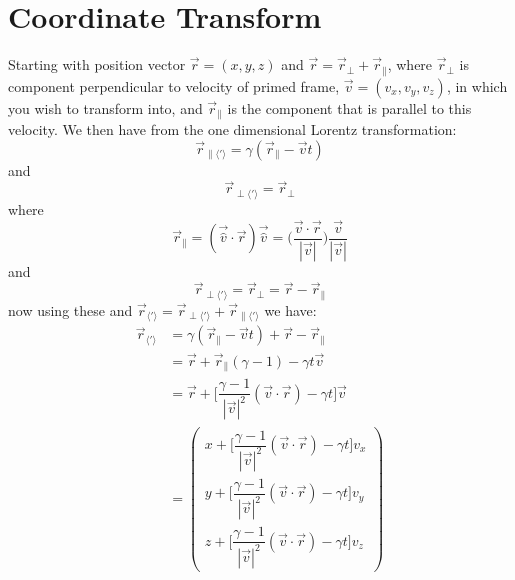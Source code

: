 \section{Coordinate Transform}

Starting with position vector $\vec{r} = (x,y,z)$ and $\vec{r} = \vec{r}_{\perp} + \vec{r}_{\parallel}$, where $\vec{r}_{\perp}$ is component perpendicular to velocity of primed frame, $\vec{v}= (v_x,v_y,v_z)$, in which you wish to transform into, and $\vec{r}_{\parallel}$ is the component that is parallel to this velocity. We then have from the one dimensional Lorentz transformation:
\begin{equation}%
    \vec{r}_{\parallel \langle ' \rangle}  = \gamma (\vec{r}_{\parallel}-\vec{v}t)
\end{equation}%
and
\begin{equation}%
    \vec{r}_{\perp \langle ' \rangle}  = \vec{r}_{\perp}
\end{equation}%
where 
\begin{equation}%
    \vec{r}_{\parallel}= \left( \vec{\hat{v}}\cdot\vec{r}\right)\vec{\hat{v}} =  \bigg(\dfrac{\vec{v}\cdot\vec{r}}{|\vec{v}|}\bigg)\dfrac{\vec{v}}{|\vec{v}|}
\end{equation}%
and
\begin{equation}%
    \vec{r}_{\perp \langle ' \rangle} = \vec{r}_{\perp}= \vec{r} - \vec{r}_{\parallel}
\end{equation}%
now using these and $\vec{r}_{\langle ' \rangle}  = \vec{r}_{\perp \langle ' \rangle}  + \vec{r}_{\parallel \langle ' \rangle} $ we have:
\begin{equation}%
    \begin{split}
    \vec{r}_{\langle ' \rangle}  &= \gamma (\vec{r}_{\parallel}-\vec{v}t) + \vec{r} - \vec{r}_{\parallel} \\
    &= \vec{r} + \vec{r}_{\parallel}(\gamma-1) - \gamma t \vec{v} \\
    &= \vec{r} + \Big[ \dfrac{\gamma-1}{|\vec{v}|^2}(\vec{v}\cdot\vec{r})- \gamma t\Big]\vec{v}\\
    &= \begin{pmatrix}
    x + \Big[ \dfrac{\gamma-1}{|\vec{v}|^2}(\vec{v}\cdot\vec{r})- \gamma t\Big] v_x\\ 
    y + \Big[ \dfrac{\gamma-1}{|\vec{v}|^2}(\vec{v}\cdot\vec{r})- \gamma t\Big] v_y\\
    z + \Big[ \dfrac{\gamma-1}{|\vec{v}|^2}(\vec{v}\cdot\vec{r})- \gamma t\Big] v_z
    \end{pmatrix}
    \end{split}
\end{equation}%
